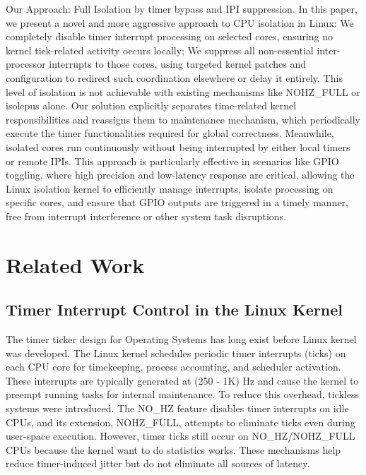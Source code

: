 \documentclass[letterpaper]{article}
\begin{document}
Our Approach: Full Isolation by timer bypass and IPI suppression. In this paper, we present a novel
and more aggressive approach to CPU isolation in Linux: We completely disable timer interrupt
processing on selected cores, ensuring no kernel tick-related activity occurs locally; We suppress
all non-essential inter-processor interrupts to those cores, using targeted kernel patches and
configuration to redirect such coordination elsewhere or delay it entirely. This level of isolation is
not achievable with existing mechanisms like NOHZ\_FULL or isolcpus alone. Our solution explicitly
separates time-related kernel responsibilities and reassigns them to maintenance mechanism,
which periodically execute the timer functionalities required for global correctness. Meanwhile,
isolated cores run continuously without being interrupted by either local timers or remote IPIs.
This approach is particularly effective in scenarios like GPIO toggling, where high precision and
low-latency response are critical, allowing the Linux isolation kernel to efficiently manage interrupts,
isolate processing on specific cores, and ensure that GPIO outputs are triggered in a timely manner,
free from interrupt interference or other system task disruptions.


\section{Related Work}\label{BG} 
\subsection{Timer Interrupt Control in the Linux Kernel}
The timer ticker design for Operating Systems has long exist before Linux kernel was
developed\cite{Corbet}.
The Linux kernel schedules periodic timer interrupts (ticks) on each CPU core for timekeeping,
process accounting, and scheduler activation. These interrupts are typically generated at (250 - 1K) Hz
and cause the kernel to preempt running tasks for internal maintenance.
To reduce this overhead, tickless systems were introduced. The NO\_HZ feature disables timer
interrupts on idle CPUs, and its extension, NOHZ\_FULL, attempts to eliminate ticks even during
user-space execution\cite{KernelDocNOHZ}. However, timer ticks still occur on NO\_HZ/NOHZ\_FULL CPUs because the
kernel want to do statistics works\cite{stackoverflow}.
These mechanisms help reduce timer-induced jitter but do not eliminate all sources of latency.
\end{document}
